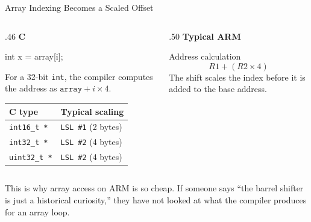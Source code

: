 \documentclass[9pt,aspectratio=169,xcolor=table]{beamer}
\begin{document}
\begin{frame}[fragile]{Array Indexing Becomes a Scaled Offset}
	\begin{columns}[T]
		\begin{column}{.46\textwidth}
			\textbf{C}

			\begin{cc}
	int x = array[i];
			\end{cc}

			\vspace{2mm}
			{\small
				For a 32-bit \texttt{int}, the compiler computes the
				address as $\texttt{array} + i \times 4$.
			}

			\vspace{5mm}
		{\small
	\begin{tabular}{@{}l l@{}}
		\toprule
		\textbf{C type} & \textbf{Typical scaling} \\
		\midrule
		\texttt{int16\_t *} & \texttt{LSL \#1} \quad (2 bytes) \\
		\texttt{int32\_t *} & \texttt{LSL \#2} \quad (4 bytes) \\
		\texttt{uint32\_t *} & \texttt{LSL \#2} \quad (4 bytes) \\
		\bottomrule
\end{tabular}}
		\end{column}

		\begin{column}{.50\textwidth}
			\textbf{Typical ARM}

			\vspace{2mm}
			\begin{block}{Address calculation}
				\[
				R1 + (R2 \times 4)
				\]
				The shift scales the index before it is added to the
				base address.
			\end{block}
		\end{column}
	\end{columns}

	\vspace{3mm}

	\begin{center}
	\end{center}
	\vspace{2mm}

This is why array access on ARM is so cheap.
{\small If someone says ``the barrel shifter is just a historical    curiosity,'' they have not looked at what the compiler produces for    an array loop.}



\end{frame}
\end{document}
